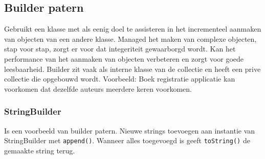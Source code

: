 \subsection{Builder patern}
Gebruikt een klasse met als eenig doel te assisteren in het incrementeel aanmaken van objecten van een andere klasse.
Managed het maken van complexe objecten, stap voor stap, zorgt er voor dat integeriteit gewaarborgd wordt.
Kan het performance van het aanmaken van objecten verbeteren en zorgt voor goede leesbaarheid.
Builder zit vaak als interne klasse van de collectie en heeft een prive collectie die opgebouwd wordt.
Voorbeeld: Boek registratie applicatie kan voorkomen dat dezelfde auteurs meerdere keren voorkomen.

\subsubsection{StringBuilder}
Is een voorbeeld van builder patern.
Nieuwe strings toevoegen aan instantie van StringBuilder met \texttt{append()}.
Wanneer alles toegevoegd is geeft \texttt{toString()} de gemaakte string terug.
